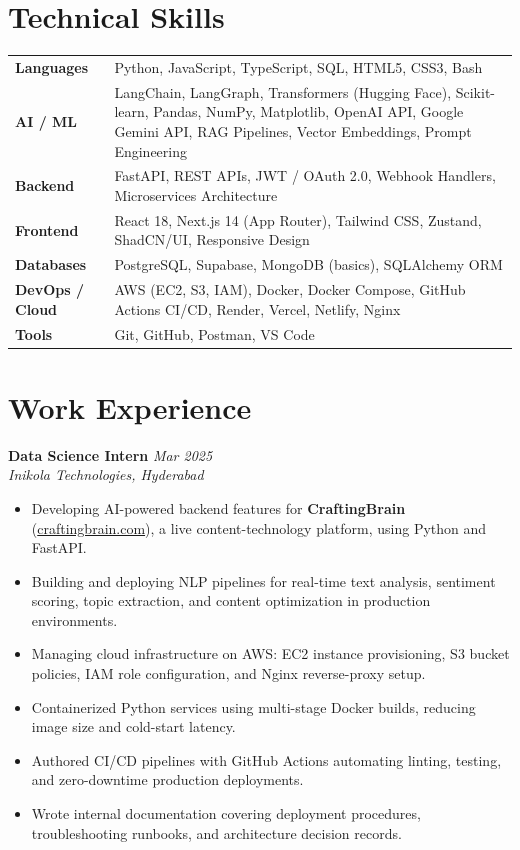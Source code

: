 \documentclass[11pt]{article}
\begin{document}
\section*{Technical Skills}

\begin{tabularx}{\textwidth}{@{}l X@{}}
\textbf{Languages} & Python, JavaScript, TypeScript, SQL, HTML5, CSS3, Bash \\[3pt]
\textbf{AI / ML} & LangChain, LangGraph, Transformers (Hugging Face), Scikit-learn, Pandas, NumPy, Matplotlib, OpenAI API, Google Gemini API, RAG Pipelines, Vector Embeddings, Prompt Engineering \\[3pt]
\textbf{Backend} & FastAPI, REST APIs, JWT / OAuth 2.0, Webhook Handlers, Microservices Architecture \\[3pt]
\textbf{Frontend} & React 18, Next.js 14 (App Router), Tailwind CSS, Zustand, ShadCN/UI, Responsive Design \\[3pt]
\textbf{Databases} & PostgreSQL, Supabase, MongoDB (basics), SQLAlchemy ORM \\[3pt]
\textbf{DevOps / Cloud} & AWS (EC2, S3, IAM), Docker, Docker Compose, GitHub Actions CI/CD, Render, Vercel, Netlify, Nginx \\[3pt]
\textbf{Tools} & Git, GitHub, Postman, VS Code \\
\end{tabularx}

\section*{Work Experience}

\textbf{Data Science Intern} \hfill \textit{Mar 2025} \\
\textit{Inikola Technologies, Hyderabad}
\begin{itemize}
\item Developing AI-powered backend features for \textbf{CraftingBrain} (\href{https://craftingbrain.com}{craftingbrain.com}), a live content-technology platform, using Python and FastAPI.
\item Building and deploying NLP pipelines for real-time text analysis, sentiment scoring, topic extraction, and content optimization in production environments.
\item Managing cloud infrastructure on AWS: EC2 instance provisioning, S3 bucket policies, IAM role configuration, and Nginx reverse-proxy setup.
\item Containerized Python services using multi-stage Docker builds, reducing image size and cold-start latency.
\item Authored CI/CD pipelines with GitHub Actions automating linting, testing, and zero-downtime production deployments.
\item Wrote internal documentation covering deployment procedures, troubleshooting runbooks, and architecture decision records.
\end{itemize}
\end{document}
